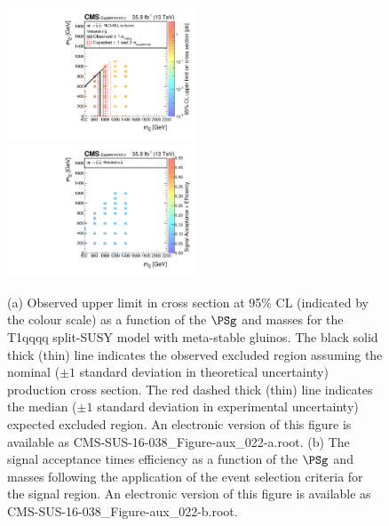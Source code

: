 \clearpage
\begin{figure}
    \begin{center}
            \includegraphics[width=0.50\textwidth]{Supplementary/CMS-SUS-16-038_Figure-aux_022-a}
	    \includegraphics[width=0.50\textwidth]{Supplementary/CMS-SUS-16-038_Figure-aux_022-b}
        \caption{ (a) Observed upper limit in cross section at 95\% CL (indicated
        by the colour scale) as a function of 
        the $\PSg$ and \PSGczDo %
        masses for the 
        T1qqqq split-SUSY model with meta-stable gluinos. 
         The  black  solid thick  (thin)  line indicates  the
        observed  excluded  region  assuming   the  nominal  (${\pm}1$  standard
        deviation in theoretical uncertainty)  production cross section. The red
        dashed  thick  (thin)  line  indicates  the  median  (${\pm}1$  standard
        deviation in experimental uncertainty) expected excluded region.
    An electronic version of this figure is available as CMS-SUS-16-038\_Figure-aux\_022-a.root.
        (b) The signal acceptance times efficiency as a function of 
        the $\PSg$ and \PSGczDo %
        masses following the application of the event selection criteria for the signal region.
    An electronic version of this figure is available as CMS-SUS-16-038\_Figure-aux\_022-b.root.
        }
        \label{fig:T1qqqqLL}
    \end{center}
\end{figure}

